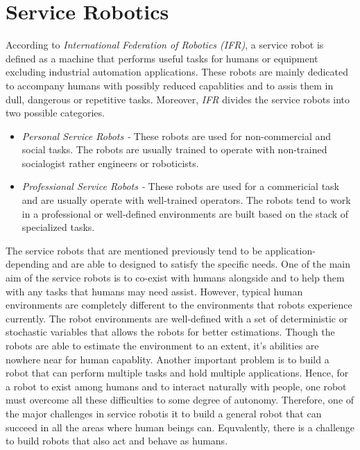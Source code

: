 \section{Service Robotics}

According to \textit{International Federation of Robotics (IFR)}, a service robot is defined as a machine that performs useful
tasks for humans or equipment excluding industrial automation applications. These robots are mainly dedicated to accompany humans
with possibly reduced capablities and to assis them in dull, dangerous or repetitive tasks. Moreover, \textit{IFR} divides the 
service robots into two possible categories.

\begin{itemize}
    \item \textit{Personal Service Robots -} These robots are used for non-commercial and social tasks. The robots are usually trained 
    to operate with non-trained socialogist rather engineers or roboticists.
    \item \textit{Professional Service Robots -} These robots are used for a commericial task and are usually operate with well-trained
    operators. The robots tend to work in a professional or well-defined environments are built based on the stack of specialized tasks.

\end{itemize}

The service robots that are mentioned previously tend to be application-depending and are able to designed to satisfy the specific needs. 
One of the main aim of the service robots is to co-exist with humans alongside and to help them with any tasks that humans may need assist.
However, typical human environments are completely different to the environments that robots experience currently. The robot environments are 
well-defined with a set of deterministic or stochastic variables that allows the robots for better estimations. Though the robots are able to 
estimate the environment to an extent, it's abilities are nowhere near for human capablity. Another important problem is to build a robot 
that can perform multiple tasks and hold multiple applications. Hence, for a robot to exist among humans and to interact naturally with people, 
one robot must overcome all these difficulties to some degree of autonomy. Therefore, one of the major challenges in service robotis it to build a 
general robot that can succeed in all the areas where human beings can. Equvalently, there is a challenge to build robots that also act and behave
as humans.


